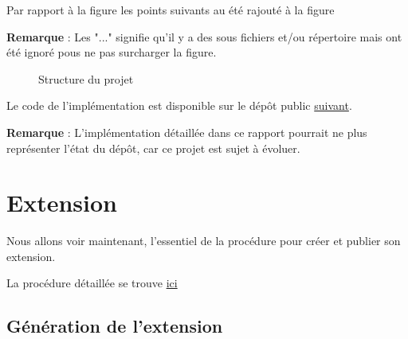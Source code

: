 \documentclass[
    iict, %
    il, %
]{heig-tb}
\begin{document}
Par rapport à la figure %
les points suivants au été rajouté à la figure %

\textbf{Remarque} : Les "..." signifie qu'il y a des sous fichiers et/ou répertoire mais ont été ignoré pous ne pas surcharger
la figure.

\begin{figure}[!h]
    \centering
    \caption{Structure du projet}
    \label{project-structure}
\end{figure}

Le code de l'implémentation est disponible sur le dépôt public \href{https://github.com/vitorva/vscode-uon}{suivant}.

\textbf{Remarque} : L'implémentation détaillée dans ce rapport pourrait ne plus représenter l'état du dépôt, car ce projet est sujet à évoluer.

\section{Extension}
Nous allons voir maintenant, l'essentiel de la procédure pour créer et publier son extension.

La procédure détaillée se trouve \href{https://code.visualstudio.com/api/get-started/your-first-extension
}{ici}

\subsection{Génération de l'extension}
\end{document}
